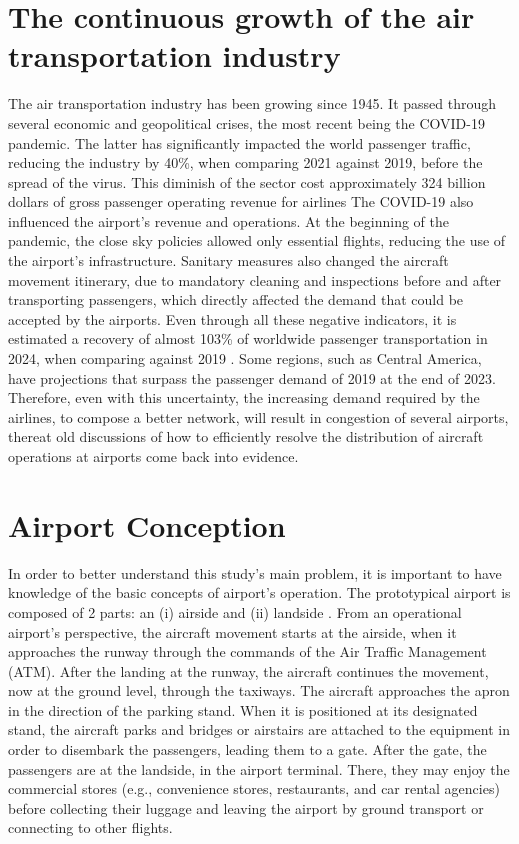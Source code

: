 
\label{section:Introduction}

\section{The continuous growth of the air transportation industry}%
\label{grow}

The air transportation industry has been growing since 1945. It passed through several economic and geopolitical crises, the most recent being the COVID-19 pandemic. The latter has significantly impacted the world passenger traffic, reducing the industry by 40\%, when comparing 2021 against 2019, before the spread of the virus. This diminish of the sector cost approximately 324 billion dollars of gross passenger operating revenue for airlines \cite{ICAOEconomicImpact} The COVID-19 also influenced the airport's revenue and operations. At the beginning of the pandemic, the close sky policies allowed only essential flights, reducing the use of the airport's infrastructure. Sanitary measures also changed the aircraft movement itinerary, due to mandatory cleaning and inspections before and after transporting passengers, which directly affected the demand that could be accepted by the airports. Even through all these negative indicators, it is estimated a recovery of almost 103\% of worldwide passenger transportation in 2024, when comparing against 2019 \cite{IATA2024}. Some regions, such as Central America, have projections that surpass the passenger demand of 2019 at the end of 2023. Therefore, even with this uncertainty, the increasing demand required by the airlines, to compose a better network, will result in congestion of several airports, thereat old discussions of how to efficiently resolve the distribution of aircraft operations at airports come back into evidence.

\section{Airport Conception}
\label{concep}

In order to better understand this study's main problem, it is important to have knowledge of the basic concepts of airport’s operation. The prototypical airport is composed of 2 parts: an (i) airside and (ii) landside \cite{Lance2009}. From an operational airport’s perspective, the aircraft movement starts at the airside, when it approaches the runway through the commands of the Air Traffic Management (ATM). After the landing at the runway, the aircraft continues the movement, now at the ground level, through the taxiways. The aircraft approaches the apron in the direction of the parking stand. When it is positioned at its designated stand, the aircraft parks and bridges or airstairs are attached to the equipment in order to disembark the passengers, leading them to a gate. After the gate, the passengers are at the landside, in the airport terminal. There, they may enjoy the commercial stores (e.g., convenience stores, restaurants, and car rental agencies) before collecting their luggage and leaving the airport by ground transport or connecting to other flights. 

